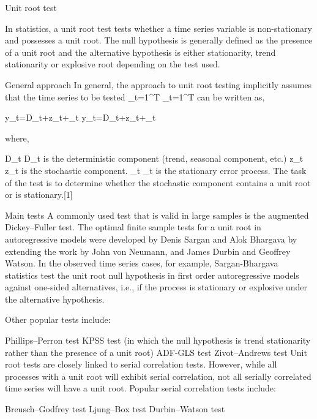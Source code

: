 Unit root test

In statistics, a unit root test tests whether a time series variable is non-stationary and possesses a unit root. The null hypothesis is generally defined as the presence of a unit root and the alternative hypothesis is either stationarity, trend stationarity or explosive root depending on the test used.

General approach
In general, the approach to unit root testing implicitly assumes that the time series to be tested {\displaystyle [y_{t}]_{t=1}^{T}} {\displaystyle [y_{t}]_{t=1}^{T}} can be written as,

{\displaystyle y_{t}=D_{t}+z_{t}+\varepsilon _{t}} {\displaystyle y_{t}=D_{t}+z_{t}+\varepsilon _{t}}

where,

{\displaystyle D_{t}} {\displaystyle D_{t}} is the deterministic component (trend, seasonal component, etc.)
{\displaystyle z_{t}} {\displaystyle z_{t}} is the stochastic component.
{\displaystyle \varepsilon _{t}} {\displaystyle \varepsilon _{t}} is the stationary error process.
The task of the test is to determine whether the stochastic component contains a unit root or is stationary.[1]

Main tests
A commonly used test that is valid in large samples is the augmented Dickey–Fuller test. The optimal finite sample tests for a unit root in autoregressive models were developed by Denis Sargan and Alok Bhargava by extending the work by John von Neumann, and James Durbin and Geoffrey Watson. In the observed time series cases, for example, Sargan-Bhargava statistics test the unit root null hypothesis in first order autoregressive models against one-sided alternatives, i.e., if the process is stationary or explosive under the alternative hypothesis.

Other popular tests include:

Phillips–Perron test
KPSS test (in which the null hypothesis is trend stationarity rather than the presence of a unit root)
ADF-GLS test
Zivot–Andrews test
Unit root tests are closely linked to serial correlation tests. However, while all processes with a unit root will exhibit serial correlation, not all serially correlated time series will have a unit root. Popular serial correlation tests include:

Breusch–Godfrey test
Ljung–Box test
Durbin–Watson test
